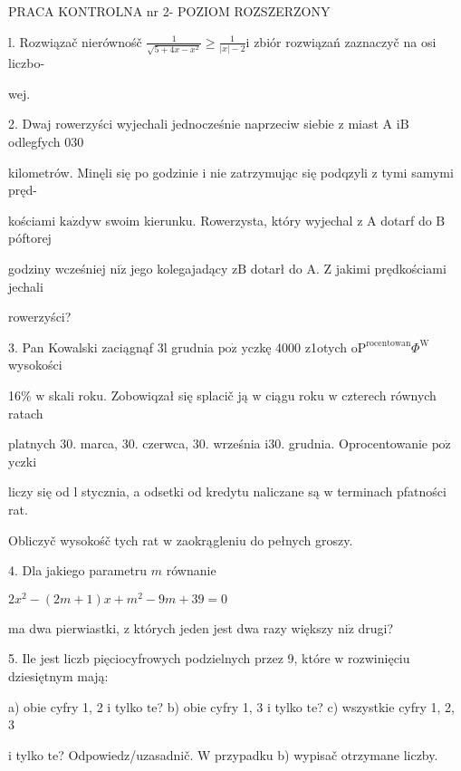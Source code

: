 \documentclass[a4paper,12pt]{article}
\begin{document}
PRACA KONTROLNA nr 2- POZIOM ROZSZERZONY

l. Rozwiązač nierównośč $\displaystyle \frac{1}{\sqrt{5+4x-x^{2}}}\geq\frac{1}{|x|-2}\mathrm{i}$ zbiór rozwiązań zaznaczyč na osi liczbo-

wej.

2. Dwaj rowerzyści wyjechali jednocześnie naprzeciw siebie $\mathrm{z}$ miast A $\mathrm{i}\mathrm{B}$ odlegfych $030$

kilometrów. Minęli się po godzinie $\mathrm{i}$ nie zatrzymując się podqzyli $\mathrm{z}$ tymi samymi pręd-

kościami $\mathrm{k}\mathrm{a}\dot{\mathrm{z}}\mathrm{d}\mathrm{y}\mathrm{w}$ swoim kierunku. Rowerzysta, który wyjechal $\mathrm{z}$ A dotarf do $\mathrm{B}$ póftorej

godziny wcześniej $\mathrm{n}\mathrm{i}\dot{\mathrm{z}}$ jego kolegajadący $\mathrm{z}\mathrm{B}$ dotarł do A. $\mathrm{Z}$ jakimi prędkościami jechali

rowerzyści?

3. Pan Kowalski zaciągnąf 3l grudnia $\mathrm{p}\mathrm{o}\dot{\mathrm{z}}$ yczkę 4000 z1otych $\mathrm{o}\mathrm{P}^{\mathrm{r}\mathrm{o}\mathrm{c}\mathrm{e}\mathrm{n}\mathrm{t}\mathrm{o}\mathrm{w}\mathrm{a}\mathrm{n}}\Phi^{\mathrm{W}}$ wysokości

16\% $\mathrm{w}$ skali roku. Zobowiqzał się splacič ją $\mathrm{w}$ ciągu roku $\mathrm{w}$ czterech równych ratach

platnych 30. marca, 30. czerwca, 30. września $\mathrm{i}30$. grudnia. Oprocentowanie $\mathrm{p}\mathrm{o}\dot{\mathrm{z}}$ yczki

liczy się od l stycznia, a odsetki od kredytu naliczane są $\mathrm{w}$ terminach pfatności rat.

Obliczyč wysokośč tych rat $\mathrm{w}$ zaokrągleniu do pełnych groszy.

4. Dla jakiego parametru $m$ równanie

$2x^{2}-(2m+1)x+m^{2}-9m+39=0$

ma dwa pierwiastki, $\mathrm{z}$ których jeden jest dwa razy większy $\mathrm{n}\mathrm{i}\dot{\mathrm{z}}$ drugi?

5. Ile jest liczb pięciocyfrowych podzielnych przez 9, które $\mathrm{w}$ rozwinięciu dziesiętnym mają:

a) obie cyfry 1, 2 $\mathrm{i}$ tylko $\mathrm{t}\mathrm{e}$? b) obie cyfry 1, 3 $\mathrm{i}$ tylko $\mathrm{t}\mathrm{e}$? c) wszystkie cyfry 1, 2, 3

$\mathrm{i}$ tylko $\mathrm{t}\mathrm{e}$? Odpowiedz/uzasadnič. $\mathrm{W}$ przypadku b) wypisač otrzymane liczby.
\end{document}

